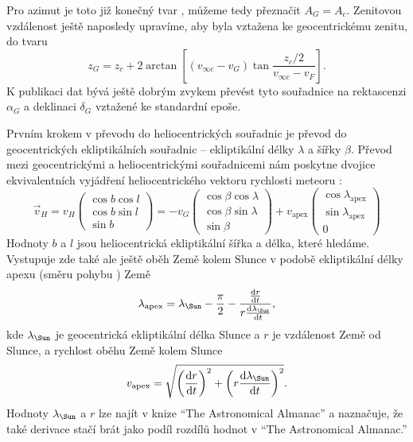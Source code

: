 \smallskip

Pro azimut je toto již konečný tvar \cite{ceplecha}, můžeme tedy přeznačit $A_G=A_c$. Zenitovou vzdálenost ještě naposledy upravíme, aby byla vztažena ke geocentrickému zenitu, do tvaru \cite{ceplecha}
\begin{equation}
    z_G=z_c+2\arctan{\left[ (v_{\infty c}-v_G) \tan{\frac{z_c/2}{v_{\infty c} - v_F}}\right]}\text{.}
\end{equation}
K publikaci dat bývá ještě dobrým zvykem převést tyto souřadnice na rektascenzi $\alpha_G$ a deklinaci $\delta_G$ vztažené ke standardní epoše.

\medskip

Prvním krokem v převodu do heliocentrických souřadnic je převod do geocentrických ekliptikálních souřadnic -- ekliptikální délky $\lambda$ a šířky $\beta$. Převod mezi geocentrickými a heliocentrickými souřadnicemi nám poskytne dvojice ekvivalentních vyjádření heliocentrického vektoru rychlosti meteoru \cite{ceplecha}:
\begin{equation}
    \vec{v}_H=v_H\begin{pmatrix}
        \cos{b}\cos{l} \\
        \cos{b}\sin{l} \\
        \sin{b}
    \end{pmatrix}=-v_G\begin{pmatrix}
        \cos{\beta}\cos{\lambda} \\
        \cos{\beta}\sin{\lambda} \\
        \sin{\beta}
    \end{pmatrix}+v_\text{apex}\begin{pmatrix}
        \cos{\lambda_\text{apex}} \\
        \sin{\lambda_\text{apex}} \\
        0
    \end{pmatrix}
\end{equation}
Hodnoty $b$ a $l$ jsou heliocentrická ekliptikální šířka a délka, které hledáme. Vystupuje zde také ale ještě oběh Země kolem Slunce v podobě ekliptikální délky apexu (směru pohybu \cite{astro}) Země \cite{ceplecha}
\begin{equation}
    \lambda_\text{apex}=\lambda_\text{\Sun}-\frac{\pi}{2}-\frac{\frac{\text{d}r}{\text{d}t}}{r\frac{\text{d}\lambda_\text{\Sun}}{\text{d}t}}\text{,}
\end{equation}
kde $\lambda_\text{\Sun}$ je geocentrická ekliptikální délka Slunce a $r$ je vzdálenost Země od Slunce, a rychlost oběhu Země kolem Slunce \cite{ceplecha}
\begin{equation}
    v_\text{apex}=\sqrt{
        \left( \frac{\text{d}r}{\text{d}t} \right)^2+
        \left( r\frac{\text{d}\lambda_\text{\Sun}}{\text{d}t} \right)^2
    }\text{.}
\end{equation}
Hodnoty $\lambda_\text{\Sun}$ a $r$ lze najít v knize "`The Astronomical Almanac"' a \cite{ceplecha} naznačuje, že také derivace stačí brát jako podíl rozdílů hodnot v "`The Astronomical Almanac."'

